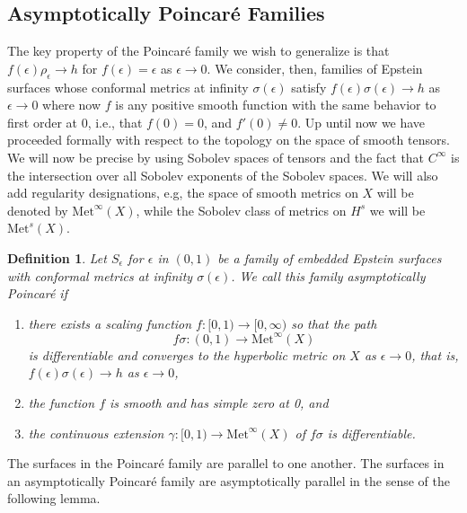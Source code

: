 \documentclass{amsart}
\newtheorem{defn}{Definition}
\begin{document}
\subsection{Asymptotically Poincar\'e Families}



The key property of the Poincar\'e family we wish to generalize is that $f(\epsilon)\rho_\epsilon \to h$ for $f(\epsilon) = \epsilon$ as $\epsilon \to 0$. 
We consider, then, families of Epstein surfaces whose conformal metrics at infinity $\sigma(\epsilon)$ satisfy $f(\epsilon)\sigma(\epsilon) \to h$ as $\epsilon \to 0$ where now $f$ is any positive smooth function with the same behavior to first order at $0$, i.e., that $f(0) = 0$, and $f'(0) \neq 0$. 
Up until now we have proceeded formally with respect to the topology on the space of smooth tensors. 
We will now be precise by using Sobolev spaces of tensors and the fact that $C^\infty$ is the intersection over all Sobolev exponents of the Sobolev spaces. 
We will also add regularity designations, e.g, the space of smooth metrics on $X$ will be denoted by $\mathrm{Met}^\infty(X)$, while the Sobolev class of metrics on $H^s$ we will be $\mathrm{Met}^s(X)$.



\begin{defn}
\label{asym-def}
Let $S_\epsilon$ for $\epsilon$ in $(0,1)$ be a family of embedded Epstein surfaces with conformal metrics at infinity $\sigma(\epsilon)$. 
We call this family \textit{asymptotically Poincar\'e} if 
\begin{enumerate}
    \item there exists a scaling function $f:[0,1) \to [0,\infty)$ so that the path 
    \[
f\sigma:(0,1) \to \mathrm{Met}^\infty(X)
\]
is differentiable and converges to the hyperbolic metric on $X$ as $\epsilon \to 0$, that is, $f(\epsilon)\sigma(\epsilon) \to h$ as $\epsilon \to 0$,
    \item the function $f$ is smooth and has simple zero at 0, and
    \item the continuous extension $\gamma:[0,1) \to \mathrm{Met}^\infty(X)$ of $f \sigma$ is differentiable.
\end{enumerate}

\end{defn}


The surfaces in the Poincar\'e family are parallel to one another. The surfaces in an asymptotically Poincar\'e family are asymptotically parallel in the sense of the following lemma. 
 
\end{document}
